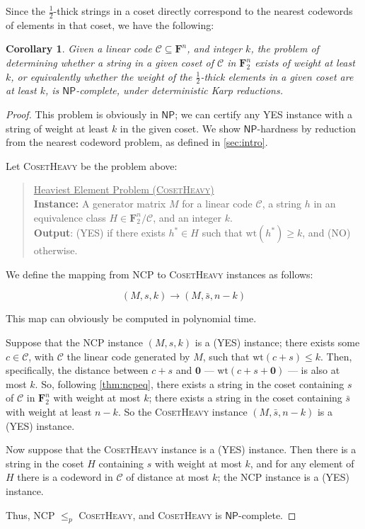 \documentclass{article}
\newtheorem{corollary}{Corollary}
\newcommand{\NP}{\mathsf{NP}}
\newcommand{\FF}{\mathbf{F}}
\newcommand{\NCP}{\textsc{NCP}}
\newcommand{\CosetHeavy}{\textsc{Coset\-Heavy}}
\newcommand{\calC}{\mathcal{C}}
\newcommand{\wt}{\text{wt}}
\begin{document}
Since the $\frac12$-thick strings in a coset directly correspond to the nearest codewords of elements in that coset, we have the following:

\begin{corollary}\label{cosetheavynp}
    Given a linear code $\calC\subseteq \FF^n$,  and integer $k$, the problem of determining whether a string in a given coset of $\calC$ in $\FF_2^n$ exists of weight at least $k$, or equivalently whether the weight of the $\frac12$-thick elements in a given coset are at least $k$, is $\NP$-complete, under deterministic Karp reductions.
\end{corollary}
\begin{proof}
This problem is obviously in $\NP$; we can certify any YES instance with a string of weight at least $k$ in the given coset. We show $\NP$-hardness by reduction from the nearest codeword problem, as defined in \cref{sec:intro}.

Let {\CosetHeavy} be the problem above:

\begin{quote}
    \underline{Heaviest Element Problem (\CosetHeavy)}\\
    \textbf{Instance:} A generator matrix $M$ for a linear code $\calC$, a string $h$ in an equivalence class $H \in \FF_2^n/\calC$, and an integer $k$.\\
    \textbf{Output}: (YES) if there exists $h^* \in H$ such that $\wt(h^*) \geq k$, and (NO) otherwise.
\end{quote}

We define the mapping from {\NCP} to {\CosetHeavy} instances as follows:

\[(M, s, k) \rightarrow (M, \bar{s}, n-k)\]

This map can obviously be computed in polynomial time.

Suppose that the {\NCP} instance $(M, s, k)$ is a (YES) instance; there exists some $c \in \calC$, with $\calC$ the linear code generated by $M$, such that $\wt(c + s) \leq k$. Then, specifically, the distance between $c + s$ and $\mathbf{0}$ --- $\wt(c + s + \mathbf{0})$ --- is also at most $k$. So, following \cref{thm:ncpeq}, there exists a string in the coset containing $s$ of $\calC$ in $\FF_2^n$ with weight at most $k$; there exists a string in the coset containing $\bar{s}$ with weight at least $n - k$. So the {\CosetHeavy} instance $(M, \bar{s}, n-k)$ is a (YES) instance.

Now suppose that the {\CosetHeavy} instance is a (YES) instance. Then there is a string in the coset $H$ containing $s$ with weight at most $k$, and for any element of $H$ there is a codeword in $\calC$ of distance at most $k$; the {\NCP} instance is a (YES) instance.

Thus, {\NCP} $\leq_p$ {\CosetHeavy}, and {\CosetHeavy} is $\NP$-complete.
\end{proof}
\end{document}
